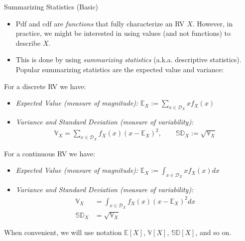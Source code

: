 \documentclass[9pt]{beamer}
\begin{document}
%
\begin{frame}{Summarizing Statistics (Basic)}

\begin{itemize}
 \setlength{\itemsep}{5pt}
\item Pdf and cdf are {\em functions} that fully characterize an RV $X$. However, in practice, we might be interested in using values (and not functions) to describe $X$.  
\item This is done by using {\em summarizing statistics} (a.k.a. descriptive statistics).  Popular summarizing statistics are the expected value and variance:
\end{itemize}
\begin{block}{}
For a discrete RV we have:
\begin{itemize}
\item {\em Expected Value (measure of magnitude):} $\mathbb{E}_X:=\sum_{x\in {\mathcal{D}}_X}x{f}_X(x)$

\item {\em Variance and Standard Deviation (measure of variability):} 
\begin{align*}
\mathbb{V}_X=\sum_{x\in {\mathcal{D}}_X}f_X(x)(x-\mathbb{E}_X)^2,\qquad \mathbb{SD}_X:=\sqrt{\mathbb{V}_X}
\end{align*}
\end{itemize}
\end{block}

\begin{block}{}
For a continuous RV we have:
\begin{itemize}
\item {\em Expected Value (measure of magnitude):}  $\mathbb{E}_X:=\int_{x\in {\mathcal{D}}_X}x{f}_X(x)dx$
\item {\em Variance and Standard Deviation (measure of variability):} 
\begin{align*}
\mathbb{V}_X&=\int_{x\in {\mathcal{D}}_X}f_X(x)(x-\mathbb{E}_X)^2dx\\
 \mathbb{SD}_X&=\sqrt{\mathbb{V}_X}
\end{align*}
\end{itemize}
\end{block}
When convenient, we will use notation $\mathbb{E}[X]$, $\mathbb{V}[X]$, $\mathbb{SD}[X]$, and so on. 
\end{frame}
\end{document}
